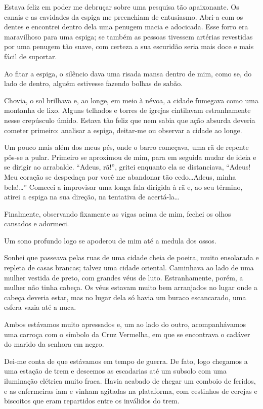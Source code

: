 Estava feliz em poder me debruçar sobre uma pesquisa tão apaixonante. Os canais e as cavidades da espiga me preenchiam de entusiasmo. Abri-a com os dentes e encontrei dentro dela uma penugem macia e adocicada. Esse forro era maravilhoso para uma espiga; se também as pessoas tivessem artérias revestidas por uma penugem tão suave, com certeza a sua escuridão seria mais doce e mais fácil de suportar.

Ao fitar a espiga, o silêncio dava uma risada mansa dentro de mim, como se, do lado de dentro, alguém estivesse fazendo bolhas de sabão.

Chovia, o sol brilhava e, ao longe, em meio à névoa, a cidade fumegava como uma montanha de lixo. Alguns telhados e torres de igrejas cintilavam estranhamente nesse crepúsculo úmido. Estava tão feliz que nem sabia que ação absurda deveria cometer primeiro: analisar a espiga, deitar-me ou observar a cidade ao longe.

Um pouco mais além dos meus pés, onde o barro começava, uma rã de repente pôs-se a pular. Primeiro se aproximou de mim, para em seguida mudar de ideia e se dirigir ao arrabalde. ``Adeus, rã!'', gritei enquanto ela se distanciava, ``Adeus! Meu coração se despedaça por você me abandonar tão cedo\dots Adeus, minha bela!\dots'' Comecei a improvisar uma longa fala dirigida à rã e, ao seu término, atirei a espiga na sua direção, na tentativa de acertá-la\dots

Finalmente, observando fixamente as vigas acima de mim, fechei os olhos cansados e adormeci.

Um sono profundo logo se apoderou de mim até a medula dos ossos.

Sonhei que passeava pelas ruas de uma cidade cheia de poeira, muito ensolarada e repleta de casas brancas; talvez uma cidade oriental. Caminhava ao lado de uma mulher vestida de preto, com grandes véus de luto. Estranhamente, porém, a mulher não tinha cabeça. Os véus estavam muito bem arranjados no lugar onde a cabeça deveria estar, mas no lugar dela só havia um buraco escancarado, uma esfera vazia até a nuca.

Ambos estávamos muito apressados e, um ao lado do outro, acompanhávamos uma carroça com o símbolo da Cruz Vermelha, em que se encontrava o cadáver do marido da senhora em negro.

Dei-me conta de que estávamos em tempo de guerra. De fato, logo chegamos a uma estação de trem e descemos as escadarias até um subsolo com uma iluminação elétrica muito fraca. Havia acabado de chegar um comboio de feridos, e as enfermeiras iam e vinham agitadas na plataforma, com cestinhos de cerejas e biscoitos que eram repartidos entre os inválidos do trem.

